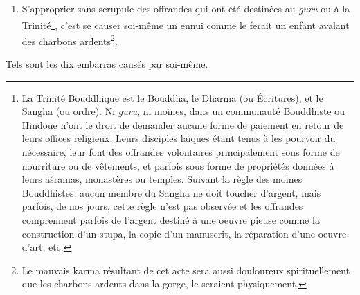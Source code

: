 \documentclass[10pt]{book}
\begin{document}
\begin{enumerate}[1.-]
\item S'approprier sans scrupule des offrandes qui ont été destinées au \textit{guru} ou à la Trinité\footnote{La Trinité Bouddhique est le Bouddha, le Dharma (ou Écritures), et le Sangha (ou ordre). Ni \textit{guru}, ni moines, dans un communauté Bouddhiste ou Hindoue n'ont le droit de demander aucune forme de paiement en retour de leurs offices religieux. Leurs disciples laïques étant tenus à les pourvoir du nécessaire, leur font des offrandes volontaires principalement sous forme de nourriture ou de vêtements, et parfois sous forme de propriétés données à leurs āśramas, monastères ou temples. Suivant la règle des moines Bouddhistes, aucun membre du Sangha ne doit toucher d'argent, mais parfois, de nos jours, cette règle n'est pas observée et les offrandes comprennent parfois de l'argent destiné à une oeuvre pieuse comme la construction d'un stupa, la copie d'un manuscrit, la réparation d'une oeuvre d'art, etc.}, c'est se causer soi-même un ennui comme le ferait un enfant avalant des charbons ardents\footnote{Le mauvais karma résultant de cet acte sera aussi douloureux spirituellement que les charbons ardents dans la gorge, le seraient physiquement.}.
\end{enumerate}
Tels sont les dix embarras causés par soi-même.
\end{document}
